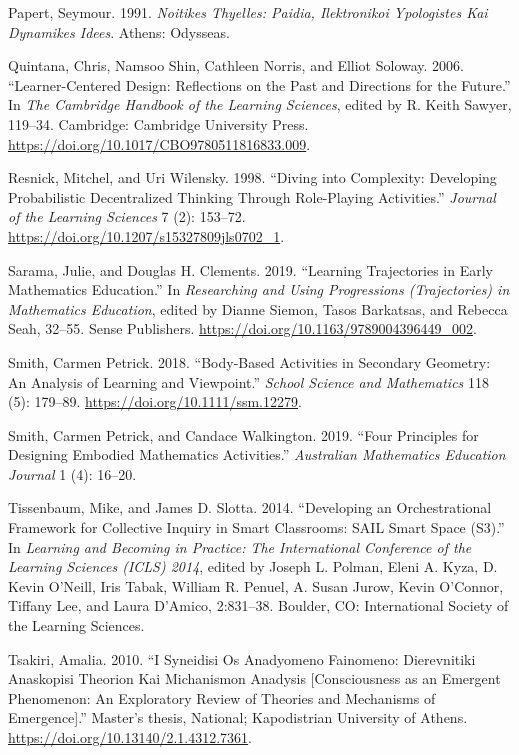 \begin{CSLReferences}{1}{0}
Papert, Seymour. 1991. \emph{Noitikes Thyelles: Paidia, Ilektronikoi
Ypologistes Kai Dynamikes Idees}. Athens: Odysseas.

Quintana, Chris, Namsoo Shin, Cathleen Norris, and Elliot Soloway. 2006.
{``Learner-Centered Design: Reflections on the Past and Directions for
the Future.''} In \emph{The Cambridge Handbook of the Learning
Sciences}, edited by R. Keith Sawyer, 119--34. Cambridge: Cambridge
University Press. \url{https://doi.org/10.1017/CBO9780511816833.009}.

Resnick, Mitchel, and Uri Wilensky. 1998. {``Diving into Complexity:
Developing Probabilistic Decentralized Thinking Through Role-Playing
Activities.''} \emph{Journal of the Learning Sciences} 7 (2): 153--72.
\url{https://doi.org/10.1207/s15327809jls0702_1}.

Sarama, Julie, and Douglas H. Clements. 2019. {``Learning Trajectories
in Early Mathematics Education.''} In \emph{Researching and Using
Progressions (Trajectories) in Mathematics Education}, edited by Dianne
Siemon, Tasos Barkatsas, and Rebecca Seah, 32--55. Sense Publishers.
\url{https://doi.org/10.1163/9789004396449_002}.

Smith, Carmen Petrick. 2018. {``Body-Based Activities in Secondary
Geometry: An Analysis of Learning and Viewpoint.''} \emph{School Science
and Mathematics} 118 (5): 179--89.
\url{https://doi.org/10.1111/ssm.12279}.

Smith, Carmen Petrick, and Candace Walkington. 2019. {``Four Principles
for Designing Embodied Mathematics Activities.''} \emph{Australian
Mathematics Education Journal} 1 (4): 16--20.

Tissenbaum, Mike, and James D. Slotta. 2014. {``Developing an
Orchestrational Framework for Collective Inquiry in Smart Classrooms:
SAIL Smart Space (S3).''} In \emph{Learning and Becoming in Practice:
The International Conference of the Learning Sciences (ICLS) 2014},
edited by Joseph L. Polman, Eleni A. Kyza, D. Kevin O'Neill, Iris Tabak,
William R. Penuel, A. Susan Jurow, Kevin O'Connor, Tiffany Lee, and
Laura D'Amico, 2:831--38. Boulder, CO: International Society of the
Learning Sciences.

Tsakiri, Amalia. 2010. {``I Syneidisi Os Anadyomeno Fainomeno:
Dierevnitiki Anaskopisi Theorion Kai Michanismon Anadysis
{[}Consciousness as an Emergent Phenomenon: An Exploratory Review of
Theories and Mechanisms of Emergence{]}.''} Master's thesis, National;
Kapodistrian University of Athens.
\url{https://doi.org/10.13140/2.1.4312.7361}.


\end{CSLReferences}
